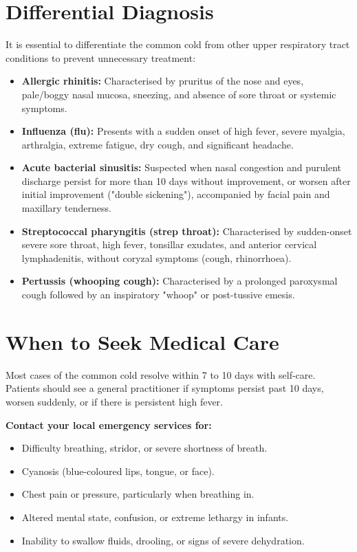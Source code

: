 \section*{Differential Diagnosis}
It is essential to differentiate the common cold from other upper respiratory tract conditions to prevent unnecessary treatment:
\begin{itemize}
    \item \textbf{Allergic rhinitis:} Characterised by pruritus of the nose and eyes, pale/boggy nasal mucosa, sneezing, and absence of sore throat or systemic symptoms.
    \item \textbf{Influenza (flu):} Presents with a sudden onset of high fever, severe myalgia, arthralgia, extreme fatigue, dry cough, and significant headache.
    \item \textbf{Acute bacterial sinusitis:} Suspected when nasal congestion and purulent discharge persist for more than 10 days without improvement, or worsen after initial improvement ("double sickening"), accompanied by facial pain and maxillary tenderness.
    \item \textbf{Streptococcal pharyngitis (strep throat):} Characterised by sudden-onset severe sore throat, high fever, tonsillar exudates, and anterior cervical lymphadenitis, without coryzal symptoms (cough, rhinorrhoea).
    \item \textbf{Pertussis (whooping cough):} Characterised by a prolonged paroxysmal cough followed by an inspiratory "whoop" or post-tussive emesis.
\end{itemize}

\section*{When to Seek Medical Care}
Most cases of the common cold resolve within 7 to 10 days with self-care. Patients should see a general practitioner if symptoms persist past 10 days, worsen suddenly, or if there is persistent high fever.

\textbf{Contact your local emergency services for:}
\begin{itemize}
    \item Difficulty breathing, stridor, or severe shortness of breath.
    \item Cyanosis (blue-coloured lips, tongue, or face).
    \item Chest pain or pressure, particularly when breathing in.
    \item Altered mental state, confusion, or extreme lethargy in infants.
    \item Inability to swallow fluids, drooling, or signs of severe dehydration.
\end{itemize}

